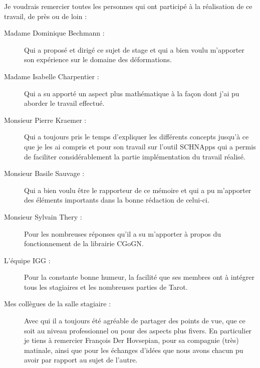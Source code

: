 


\begin{acknowledgementslong}

Je voudrais remercier toutes les personnes qui ont participé à la réalisation
de ce travail, de près ou de loin :

\begin{description} 

\item[Madame Dominique Bechmann : ] Qui a proposé et dirigé ce sujet
de stage et qui a bien voulu m'apporter son expérience sur le domaine des
déformations.

\item[Madame Isabelle Charpentier : ] Qui a su apporté un aspect plus
mathématique à la façon dont j'ai pu aborder le travail effectué.

\item[Monsieur Pierre Kraemer : ] Qui a toujours pris le temps
d'expliquer les différents concepts jusqu'à ce que je les ai compris et pour
son travail sur l'outil SCHNApps qui a permis de faciliter considérablement
la partie implémentation du travail réalisé.

\item[Monsieur Basile Sauvage : ] Qui a bien voulu être le rapporteur
de ce mémoire et qui a pu m'apporter des éléments importants dans la bonne
rédaction de celui-ci.

\item[Monsieur Sylvain Thery : ] Pour les nombreuses réponses qu'il a
su m'apporter à propos du fonctionnement de la librairie CGoGN.

\item[L'équipe IGG : ] Pour la constante bonne humeur, la facilité
que ses membres ont à intégrer tous les stagiaires et les nombreuses parties
de Tarot.

\item[Mes collègues de la salle stagiaire : ] Avec qui il a toujours été
agréable de partager des points de vue, que ce soit au niveau professionnel ou
pour des aspects plus fivers. En particulier je tiens à remercier François Der
Hovsepian, pour sa compagnie (très) matinale, ainsi que pour les échanges
d'idées que nous avons chacun pu avoir par rapport au sujet de l'autre.

\end{description}

\end{acknowledgementslong}


